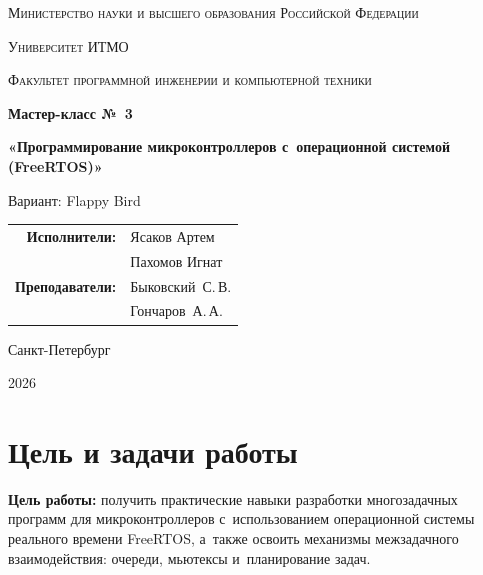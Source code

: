 \documentclass[a4paper,12pt]{article}
\begin{document}
\begin{titlepage}
    \centering
    {\scshape\large Министерство науки и высшего образования Российской Федерации\par}
    \vspace{0.5cm}
    {\scshape\large Университет ИТМО\par}
    \vspace{0.3cm}
    {\scshape\large Факультет программной инженерии и компьютерной техники\par}
    \vspace{3cm}


    {\Large\bfseries Мастер-класс №~3\par}
    \vspace{0.5cm}
    {\Large\bfseries «Программирование микроконтроллеров с~операционной системой (FreeRTOS)»\par}
    \vspace{1cm}
    {\large Вариант: Flappy Bird\par}


    \vspace{4cm}
    \begin{flushright}
        \begin{tabular}{rl}
            \textbf{Исполнители:} & Ясаков Артем \\
                                  & Пахомов Игнат \\[0.3cm]
            \textbf{Преподаватели:} & Быковский~С.\,В. \\
                                    & Гончаров~А.\,А. \\
        \end{tabular}
    \end{flushright}


    \vfill
    {\large Санкт-Петербург\par}
    {\large 2026\par}
\end{titlepage}


\tableofcontents
\newpage


\section{Цель и задачи работы}


\textbf{Цель работы:} получить практические навыки разработки многозадачных программ для микроконтроллеров с~использованием операционной системы реального времени FreeRTOS, а~также освоить механизмы межзадачного взаимодействия: очереди, мьютексы и~планирование задач.
\end{document}
